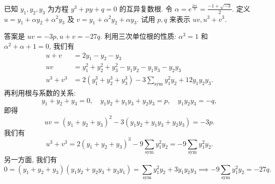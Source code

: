 \begin{prob}
\label{prob:prob-6}
已知 $y_1, y_2, y_3$ 为方程 $y^3 + py + q = 0$ 的互异复数根.
令 $\alpha = e^{\frac{2\pi i}{3}} = \frac{-1 + \sqrt{-3}}{2}$.
定义 $u = y_1 + \alpha y_2 + \alpha^2 y_3$ 及
$v = y_1 + \alpha^2 y_2 + \alpha y_3$.
试用 $p, q$ 来表示 $uv, u^3 + v^3$.
\end{prob}

\begin{soln}
答案是 $\boxed{uv = -3p, u + v = -27q.}$
利用三次单位根的性质: $\alpha^3 = 1$ 和 $\alpha^2 + \alpha + 1 = 0$,
我们有
\begin{align*}
u + v     &= 2y_1 - y_2 - y_3\\
uv        &= y_1^2 +y_2^2 +y_3^2 - y_1y_2 - y_1y_3 - y_2y_3\\
u^3 + v^3 &= 2(y_1^3 + y_2^3 + y_3^3) - 3\sum_{\text{sym}}y_1^2y_2 + 12y_1y_2y_3.
\end{align*}
再利用根与系数的关系:
\[
y_1 + y_2 + y_3 = 0, \quad
y_1y_2 + y_1y_3 + y_2y_3 = p, \quad
y_1y_2y_3 = -q,
\]
即得
\[
uv = (y_1+y_2+y_3)^2 - 3(y_1y_2 + y_1y_3 + y_2y_3) = -3p.
\]
我们有
\[
u^3 + v^3 = 2(y_1 + y_2 + y_3)^3 - 9\sum_{\text{sym}}y_1^2y_2
          = -9\sum_{\text{sym}}y_1^2y_2.
\]
另一方面, 我们有
\[
0 = (y_1 + y_2 + y_3)(y_1y_2 + y_2y_3 + y_3y_1)
  = \sum_{\text{sym}}y_1^2y_2 + 3y_1y_2y_3
  \implies -9\sum_{\text{sym}}y_1^2y_2 = -27q.
\]
\end{soln}
